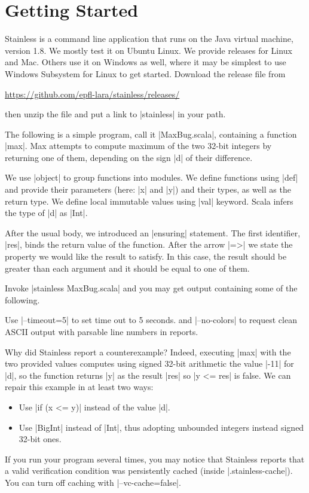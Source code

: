 \section{Getting Started}

Stainless is a command line application that runs on the Java virtual machine, version 1.8.
We mostly test it on Ubuntu Linux. We provide releases for Linux and Mac. 
Others use it on Windows as well, where it may be simplest to use Windows Subsystem for Linux
to get started. Download the release file from 
\begin{center}
\url{https://github.com/epfl-lara/stainless/releases/}
\end{center}
then unzip the file and put a link to |stainless| in your path.

The following is a simple program, call it |MaxBug.scala|, containing
a function |max|. Max attempts to compute maximum of the two 32-bit integers by
returning one of them, depending on the sign |d| of their difference.

We use |object| to group functions into modules. We define functions using |def|
and provide their parameters (here: |x| and |y|) and their types, as well as the return type.
We define local immutable values using |val| keyword. Scala infers the type of |d| as |Int|.

After the usual body, we introduced an |ensuring| statement. The first identifier, |res|,
binds the return value of the function. After the arrow |=>| we state the property we would
like the result to satisfy. In this case, the result should be greater than each argument
and it should be equal to one of them.

Invoke |stainless MaxBug.scala| and you may get output containing some of the following.

Use |--timeout=5| to set time out to 5 seconds.
and |--no-colors| to request clean ASCII output with parsable line numbers in reports.

Why did Stainless report a counterexample? Indeed, executing |max|
with the two provided values computes using signed 32-bit arithmetic the value |-11| for |d|,
so the function returns |y| as the result |res| so |y <= res| is false.
We can repair this example in at least two ways:
\begin{itemize}
\item Use |if (x <= y)| instead of the value |d|.
\item Use |BigInt| instead of |Int|, thus adopting unbounded integers instead signed 32-bit ones.
\end{itemize}
If you run your program several times, you may notice that Stainless reports that a valid verification
condition was persistently cached (inside |.stainless-cache|). You can turn off caching with |--vc-cache=false|.

